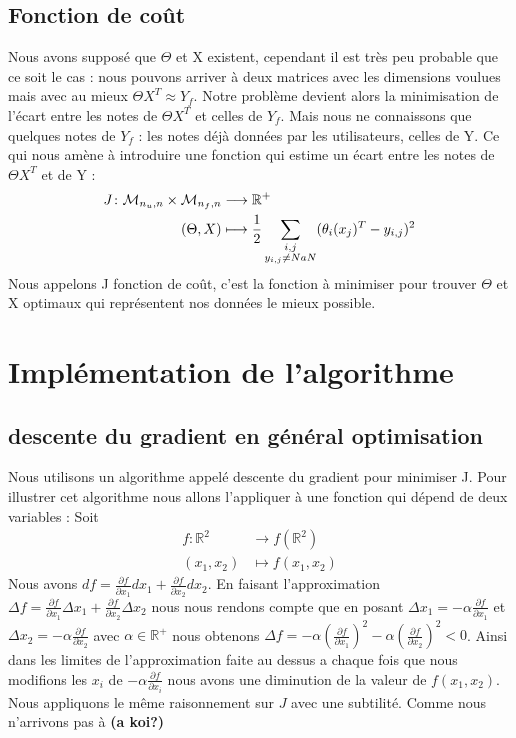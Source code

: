 \documentclass[a4paper,10pt]{article}
\begin{document}
\subsection{Fonction de coût}

Nous avons supposé que $\Theta$ et X existent, cependant il est très peu probable que ce soit le cas : nous pouvons arriver à deux matrices avec les dimensions voulues mais avec au mieux $\Theta X^T \approx Y_f$. Notre problème devient alors la minimisation de l'écart entre les notes de $\Theta X^T$ et celles de $Y_f$. Mais nous ne connaissons que quelques notes de $Y_f$ : les notes déjà données par les utilisateurs, celles de Y. Ce qui nous amène à introduire une fonction qui estime un écart entre les notes de $\Theta X^T$ et de Y :
\begin{align*}
J\colon{\cal M}_{n_u, n} \times {\cal M}_{n_f, n} &\longrightarrow \mathbb{R}^+\\
(\Theta, X)&\longmapsto \frac{1}{2}\sum_{\substack{i,j \\ y_{i,j} \ne NaN}}(\theta_{i}(x_{j})^{T}-y_{i,j})^{2}
\end{align*}
Nous appelons J fonction de coût, c'est la fonction à minimiser pour trouver $\Theta$ et X optimaux qui représentent nos données le mieux possible.

\section{Implémentation de l'algorithme}
\subsection{descente du gradient en général optimisation}
Nous utilisons un algorithme appelé descente du gradient pour minimiser J. Pour illustrer cet algorithme nous allons l'appliquer à une fonction qui dépend de deux variables : Soit
\begin{align*}
f\colon \mathbb{R}^2&\longrightarrow f(\mathbb{R}^2)\\
(x_1, x_2)&\longmapsto f(x_1, x_2)
\end{align*}
Nous avons $df = \frac{\partial f}{\partial x_{1}}d x_{1} + \frac{\partial f}{\partial x_{2}}dx_{2}$. En faisant l'approximation
 $\Delta f = \frac{\partial f}{\partial x_{1}}\Delta  x_{1} + \frac{\partial f}{\partial x_{2}}\Delta x_{2}$ nous nous rendons compte
 que en posant $\Delta x_{1} = -\alpha \frac{\partial f}{\partial x_{1}}$
 et $\Delta x_{2} = -\alpha \frac{\partial f}{\partial x_{2}}$ avec $\alpha \in \mathbb{R}^+$
 nous obtenons $\Delta f = -\alpha (\frac{\partial f}{\partial x_{1}})^{2} - \alpha (\frac{\partial f}{\partial x_{2}})^{2} < 0$. Ainsi dans
 les limites de l'approximation faite au dessus a chaque fois que nous modifions les $x_{i}$ de $- \alpha \frac{\partial f}{\partial x_{i}}$
 nous avons une diminution de la valeur de $f(x_1, x_2)$.
Nous appliquons le même raisonnement sur $J$ avec une subtilité. Comme nous n'arrivons pas à \textbf{(a koi?)}
\end{document}
